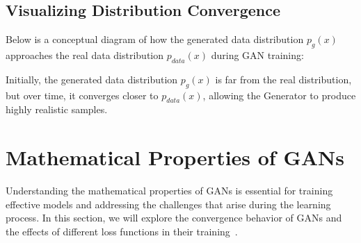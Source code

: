 \subsection{Visualizing Distribution Convergence}
Below is a conceptual diagram of how the generated data distribution \( p_g(x) \) approaches the real data distribution \( p_{data}(x) \) during GAN training:

\begin{center}
\end{center}

Initially, the generated data distribution \( p_g(x) \) is far from the real distribution, but over time, it converges closer to \( p_{data}(x) \), allowing the Generator to produce highly realistic samples.










\section{Mathematical Properties of GANs}
Understanding the mathematical properties of GANs is essential for training effective models and addressing the challenges that arise during the learning process. In this section, we will explore the convergence behavior of GANs and the effects of different loss functions in their training~\cite{goodfellow2014generative, he2018probgan, farnia2020gans}.

